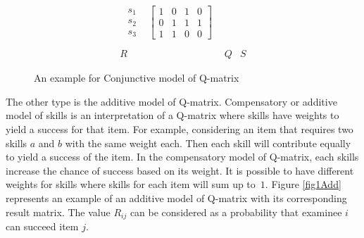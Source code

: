 \begin{figure}
\begin{footnotesize}
\[\begin{array}{ccc}
\begin{array}{cc}
\begin{array}{c}
s_{1}\\
s_{2}\\
s_{3}
\end{array} & \left[\begin{array}{cccc}
1 & 0 & 1 & 0\\
0 & 1 & 1 & 1\\
1 & 1 & 0 & 0
\end{array}\right]
\end{array}\\
\\
R & Q & S
\end{array}
\]
 \end{footnotesize} \caption{An example for Conjunctive model of Q-matrix}


\label{fig1} 
\end{figure}

The other type is the additive model of Q-matrix. Compensatory or additive model of skills is an interpretation of a Q-matrix where skills have weights to yield a success for that item. For example, considering an item that requires two skills $a$ and $b$ with the same weight each. Then each skill will contribute equally to yield a success of the item. In the compensatory model of Q-matrix, each skills increase the chance of success based on its weight. It is possible to have different weights for skills where skills for each item will sum up to~$1$. Figure \ref{fig1Add} represents an example of an additive model of Q-matrix with its corresponding result matrix. The value $R_{ij}$  can be considered as a probability that examinee $i$ can succeed item $j$.

